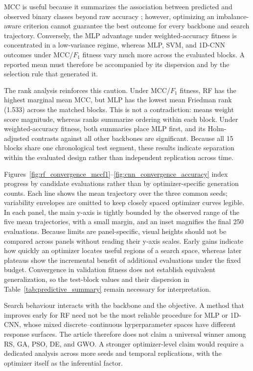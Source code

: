 MCC is useful because it summarizes the association between predicted and observed binary classes beyond raw accuracy \cite{chicco2020mcc}; however, optimizing an imbalance-aware criterion cannot guarantee the best outcome for every backbone and search trajectory. Conversely, the MLP advantage under weighted-accuracy fitness is concentrated in a low-variance regime, whereas MLP, SVM, and 1D-CNN outcomes under MCC/$F_1$ fitness vary much more across the evaluated blocks. A reported mean must therefore be accompanied by its dispersion and by the selection rule that generated it.

The rank analysis reinforces this caution. Under MCC/$F_1$ fitness, RF has the highest marginal mean MCC, but MLP has the lowest mean Friedman rank (1.533) across the matched blocks. This is not a contradiction: means weight score magnitude, whereas ranks summarize ordering within each block. Under weighted-accuracy fitness, both summaries place MLP first, and its Holm-adjusted contrasts against all other backbones are significant. Because all 15 blocks share one chronological test segment, these results indicate separation within the evaluated design rather than independent replication across time.


Figures~\ref{fig:rf_convergence_mccf1}--\ref{fig:cnn_convergence_accuracy} index progress by candidate evaluations rather than by optimizer-specific generation counts. Each line shows the mean trajectory over the three common seeds; variability envelopes are omitted to keep closely spaced optimizer curves legible. In each panel, the main y-axis is tightly bounded by the observed range of the five mean trajectories, with a small margin, and an inset magnifies the final 250 evaluations. Because limits are panel-specific, visual heights should not be compared across panels without reading their y-axis scales. Early gains indicate how quickly an optimizer locates useful regions of a search space, whereas later plateaus show the incremental benefit of additional evaluations under the fixed budget. Convergence in validation fitness does not establish equivalent generalization, so the test-block values and their dispersion in Table~\ref{tab:predictive_summary} remain necessary for interpretation.

Search behaviour interacts with the backbone and the objective. A method that improves early for RF need not be the most reliable procedure for MLP or 1D-CNN, whose mixed discrete--continuous hyperparameter spaces have different response surfaces. The article therefore does not claim a universal winner among RS, GA, PSO, DE, and GWO. A stronger optimizer-level claim would require a dedicated analysis across more seeds and temporal replications, with the optimizer itself as the inferential factor.


